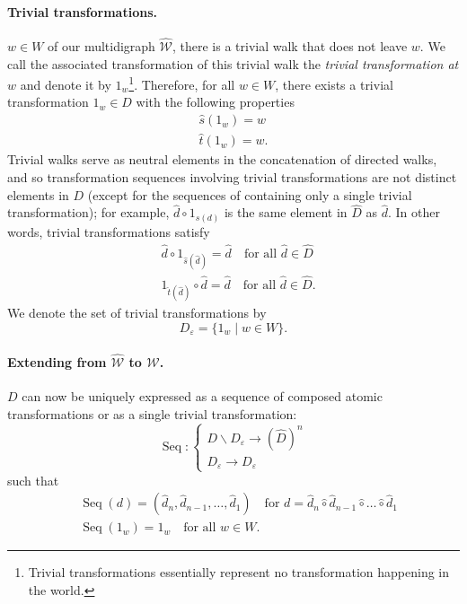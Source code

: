 \paragraph{Trivial transformations.}
 $w \in W$ of our multidigraph $\hat{\mathscr{W}}$, there is a trivial walk that does not leave $w$.
We call the associated transformation of this trivial walk the \emph{trivial transformation at $w$} and denote it by $1_{w}$\footnote{
Trivial transformations essentially represent no transformation happening in the world.
}.
Therefore, for all $w \in W$, there exists a trivial transformation $1_{w} \in D$ with the following properties
\begin{align}
	\hat{s}(1_{w}) = w \\
	\hat{t}(1_{w}) = w.
\end{align}
Trivial walks serve as neutral elements in the concatenation of directed walks, and so transformation sequences involving trivial transformations are not distinct elements in $D$ (except for the sequences of containing only a single trivial transformation); for example, $\hat{d} \circ 1_{s(d)}$ is the same element in $\hat{D}$ as $\hat{d}$.
In other words, trivial transformations satisfy
\begin{align}
	& \hat{d} \circ 1_{\hat{s}(\hat{d})} = \hat{d} \quad \text{for all $\hat{d} \in \hat{D}$} \\
	& 1_{\hat{t}(\hat{d})} \circ \hat{d} = \hat{d} \quad \text{for all $\hat{d} \in \hat{D}$}.
\end{align}
We denote the set of trivial transformations by
\begin{equation}
	D_{\varepsilon} = \{ 1_{w} \mid w \in W \}.
\end{equation}

\paragraph{Extending from $\hat{\mathscr{W}}$ to $\mathscr{W}$.}
 $D$ can now be uniquely expressed as a sequence of composed atomic transformations or as a single trivial transformation:
\begin{equation}
    \operatorname{Seq} : \left\{ 
    \begin{array}{l}
        D \backslash D_{\varepsilon} \to (\hat{D})^{n} \\
        D_{\varepsilon} \to D_{\varepsilon}
    \end{array} \right.
\end{equation}
such that
\begin{align}
    & \operatorname{Seq}(d) = (\hat{d}_{n}, \hat{d}_{n-1}, \dots, \hat{d}_{1}) \quad \text{for $d = \hat{d}_{n} \hat{\circ} \hat{d}_{n-1} \hat{\circ} \dots \hat{\circ} \hat{d}_{1}$} \\
    & \operatorname{Seq}(1_{w}) = 1_{w} \quad \text{for all $w \in W$}.
\end{align}

